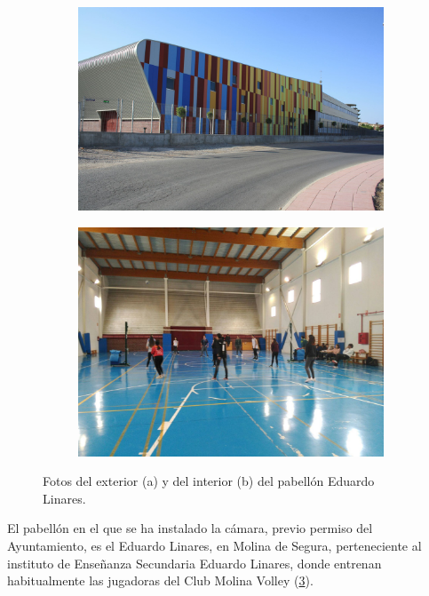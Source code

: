 \begin{figure}
\begin{subfigure}{.5\textwidth}
  \centering
  \includegraphics[width=.9\linewidth]{images/EduardoLinares}
  \caption { }
  \label{fig:pabellonFuera}
\end{subfigure}%
\begin{subfigure}{.5\textwidth}
  \centering
  \includegraphics[width=.9\linewidth]{images/EduardoLinaresDentro}
  \caption { }
  \label{fig:pabellonDentro}
\end{subfigure}
\caption{Fotos del exterior (a) y del interior (b) del pabellón Eduardo Linares. }
\label{fig:pabellon}
\end{figure}

El pabellón en el que se ha instalado la cámara, previo permiso del Ayuntamiento, es el Eduardo Linares, en Molina de Segura, perteneciente al instituto de Enseñanza Secundaria Eduardo Linares, donde entrenan habitualmente las jugadoras del Club Molina Volley (\ref{fig:pabellon}).

